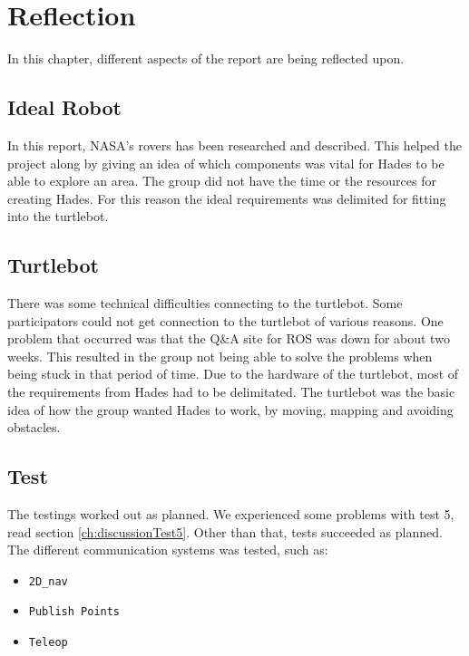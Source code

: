 \chapter{Reflection}
In this chapter, different aspects of the report are being reflected upon.

\section{Ideal Robot}
In this report, NASA's rovers has been researched and described. This helped the project along by giving an idea of which components was vital for Hades to be able to explore an area. The group did not have the time or the resources for creating Hades. For this reason the ideal requirements was delimited for fitting into the turtlebot.

\section{Turtlebot}
There was some technical difficulties connecting to the turtlebot. Some participators could not get connection to the turtlebot of various reasons. One problem that occurred was that the Q&A site for ROS was down for about two weeks. This resulted in the group not being able to solve the problems when being stuck in that period of time.
Due to the hardware of the turtlebot, most of the requirements from Hades had to be delimitated. The turtlebot was the basic idea of how the group wanted Hades to work, by moving, mapping and avoiding obstacles.


\section{Test}
The testings worked out as planned. We experienced some problems with test 5, read section \ref{ch:discussionTest5}. Other than that, tests succeeded as planned. 
The different communication systems was tested, such as:
\begin{itemize}
    \item \texttt{2D\_nav}
    \item \texttt{Publish Points}
    \item \texttt{Teleop}
\end{itemize}


